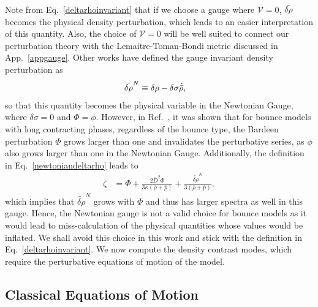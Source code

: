 \documentclass[a4paper,11pt]{article}
\begin{document}
Note from Eq.~\eqref{deltarhoinvariant} that if we choose a gauge where $\mathcal{V} =0$, $\Tilde{\delta\rho}$ becomes the physical density perturbation, which leads to an easier interpretation of this quantity. Also, the choice of $\mathcal{V} =0$ will be well suited to connect our perturbation theory with the Lemaitre-Toman-Bondi metric discussed in App.~\ref{appgauge}.  Other works have defined the gauge invariant density perturbation as
\begin{align}
\label{newtoniandeltarho}
    \Tilde{\delta\rho}^{N} &\equiv \delta\rho - \delta\sigma \dot{\Bar{\rho}}
,\end{align}
so that this quantity becomes the physical variable in the Newtonian Gauge, where $\delta\sigma = 0$ and $\Phi = \phi$. However, in Ref.~\cite{vitenti2012large}, it was shown that for bounce models with long contracting phases, regardless of the bounce type, the Bardeen perturbation $\Phi$ grows larger than one and invalidates the perturbative series, as $\phi$ also grows larger than one in the Newtonian Gauge. Additionally, the definition in Eq.~\eqref{newtoniandeltarho} leads to
\begin{align}
    		\zeta &= \Phi + \frac{2\bar{D}^2 \Phi}{3  \kappa (\bar{\rho}+\bar{p})}+  \frac{{\tilde{\delta\rho}^N}} {3(\bar{\rho}+\bar{p})}
,\end{align}
which implies that $\tilde{\delta\rho}^N$ grows with $\Phi$ and thus has larger spectra as well in this gauge. Hence, the Newtonian gauge is not a valid choice for bounce models as it would lead to miss-calculation of the physical quantities whose values would be inflated. We shall avoid this choice in this work and stick with the definition in Eq.~\eqref{deltarhoinvariant}. We now compute the density contrast modes, which require the perturbative equations of motion of the model. 

\subsection{Classical Equations of Motion}
\end{document}
